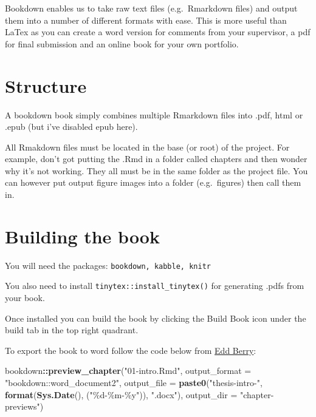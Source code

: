 \documentclass[
  12pt,
  oneside]{book}
\newenvironment{Shaded}{\begin{snugshade}}{\end{snugshade}}
\newcommand{\AttributeTok}[1]{\textcolor[rgb]{0.13,0.29,0.53}{#1}}
\newcommand{\FunctionTok}[1]{\textcolor[rgb]{0.13,0.29,0.53}{\textbf{#1}}}
\newcommand{\NormalTok}[1]{#1}
\newcommand{\SpecialCharTok}[1]{\textcolor[rgb]{0.81,0.36,0.00}{\textbf{#1}}}
\newcommand{\StringTok}[1]{\textcolor[rgb]{0.31,0.60,0.02}{#1}}
\begin{document}

Bookdown enables us to take raw text files (e.g.~Rmarkdown files) and output them into a number of different formats with ease. This is more useful than LaTex as you can create a word version for comments from your supervisor, a pdf for final submission and an online book for your own portfolio.

\section{Structure}\label{structure}

A bookdown book simply combines multiple Rmarkdown files into .pdf, html or .epub (but i've disabled epub here).

All Rmakdown files must be located in the base (or root) of the project. For example, don't got putting the .Rmd in a folder called chapters and then wonder why it's not working. They all must be in the same folder as the project file. You can however put output figure images into a folder (e.g.~figures) then call them in.

\section{Building the book}\label{building-the-book}

You will need the packages: \texttt{bookdown,\ kabble,\ knitr}

You also need to install \texttt{tinytex::install\_tinytex()} for generating .pdfs from your book.

Once installed you can build the book by clicking the Build Book icon under the build tab in the top right quadrant.

To export the book to word follow the code below from \href{https://www.eddjberry.com/post/writing-your-thesis-with-bookdown/}{Edd Berry}:

\begin{Shaded}
\begin{Highlighting}[]
\NormalTok{bookdown}\SpecialCharTok{::}\FunctionTok{preview\_chapter}\NormalTok{(}\StringTok{"01{-}intro.Rmd"}\NormalTok{,}
                \AttributeTok{output\_format =} \StringTok{"bookdown::word\_document2"}\NormalTok{,}
                \AttributeTok{output\_file =} \FunctionTok{paste0}\NormalTok{(}\StringTok{"thesis{-}intro{-}"}\NormalTok{, }
                                     \FunctionTok{format}\NormalTok{(}\FunctionTok{Sys.Date}\NormalTok{(), }
\NormalTok{                                            (}\StringTok{"\%d{-}\%m{-}\%y"}\NormalTok{)), }
                                     \StringTok{".docx"}\NormalTok{),}
                \AttributeTok{output\_dir =} \StringTok{"chapter{-}previews"}\NormalTok{)}
\end{Highlighting}
\end{Shaded}
\end{document}
